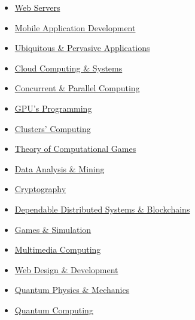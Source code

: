 \documentclass[10pt,a4paper,academicons]{altacv}
\begin{document}
{\begin{itemize}
\item \hspace{0.5em} \href{https://en.wikipedia.org/wiki/Web-server}{Web Servers}
\item \hspace{0.5em} \href{https://en.wikipedia.org/wiki/Mobile_app_development}{Mobile Application Development}
\item \hspace{0.5em} \href{https://en.wikipedia.org/wiki/Ubiquitous_computing}{Ubiquitous \& Pervasive Applications}
\item \hspace{0.5em} \href{https://en.wikipedia.org/wiki/Cloud_computing}{Cloud Computing \& Systems}
\item \hspace{0.5em} \href{https://en.wikipedia.org/wiki/Parallel_computing}{Concurrent \& Parallel Computing}
\item \hspace{0.5em} \href{https://en.wikipedia.org/wiki/CUDA}{GPU's Programming}
\item \hspace{0.5em} \href{https://en.wikipedia.org/wiki/Computer_cluster}{Clusters' Computing}
\item \hspace{0.5em} \href{https://en.wikipedia.org/wiki/Game_theory}{Theory of Computational Games}
\item \hspace{0.5em} \href{https://en.wikipedia.org/wiki/Data_mining}{Data Analysis \& Mining}
\item \hspace{0.5em} \href{https://en.wikipedia.org/wiki/Cryptography}{Cryptography}
\item \hspace{0.5em} \href{https://en.wikipedia.org/wiki/Blockchain}{Dependable Distributed Systems \& Blockchains}
\item \hspace{0.5em} \href{https://en.wikipedia.org/wiki/Simulation_video_game}{Games \& Simulation}
\item \hspace{0.5em} \href{https://en.wikipedia.org/wiki/Multimedia}{Multimedia Computing}
\item \hspace{0.5em} \href{https://en.wikipedia.org/wiki/Artificial_intelligence}{Web Design \& Development}
\item \hspace{0.5em} \href{https://en.wikipedia.org/wiki/Quantum_mechanics}{Quantum Physics \& Mechanics}
\item \hspace{0.5em} \href{https://en.wikipedia.org/wiki/Quantum_computing}{Quantum Computing}

\end{itemize}
}
\end{document}
